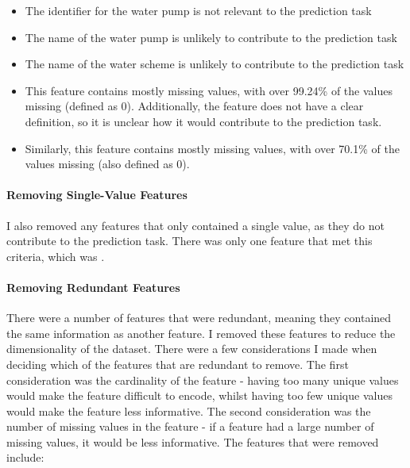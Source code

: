 \documentclass{article}
\begin{document}
\begin{itemize}
  \item {} The identifier for the water pump is not relevant to the prediction task
  \item {} The name of the water pump is unlikely to contribute to the prediction task
  \item {} The name of the water scheme is unlikely to contribute to the prediction task
  \item {} This feature contains mostly missing values, with over 99.24\% of the values missing (defined as 0). Additionally, the feature does not have a clear definition, so it is unclear how it would contribute to the prediction task.
  \item {} Similarly, this feature contains mostly missing values, with over 70.1\% of the values missing (also defined as 0). 
\end{itemize}

\paragraph{Removing Single-Value Features}
I also removed any features that only contained a single value, as they do not contribute to the prediction task. There was only one feature that met this criteria, which was .

\paragraph{Removing Redundant Features}
There were a number of features that were redundant, meaning they contained the same information as another feature. I removed these features to reduce the dimensionality of the dataset. There were a few considerations I made when deciding which of the features that are redundant to remove. The first consideration was the cardinality of the feature - having too many unique values would make the feature difficult to encode, whilst having too few unique values would make the feature less informative. The second consideration was the number of missing values in the feature - if a feature had a large number of missing values, it would be less informative. The features that were removed include:
\end{document}
